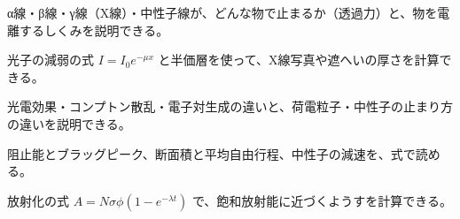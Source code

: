 \begin{furikaeri}
\begin{checklist}
\item α線・β線・γ線（X線）・中性子線が、どんな物で止まるか（透過力）と、物を電離するしくみを説明できる。
\item 光子の減弱の式 $I=I_0e^{-\mu x}$ と半価層を使って、X線写真や遮へいの厚さを計算できる。
\item 光電効果・コンプトン散乱・電子対生成の違いと、荷電粒子・中性子の止まり方の違いを説明できる。
\item 阻止能とブラッグピーク、断面積と平均自由行程、中性子の減速を、式で読める。
\item 放射化の式 $A=N\sigma\phi(1-e^{-\lambda t})$ で、飽和放射能に近づくようすを計算できる。
\end{checklist}
\end{furikaeri}
